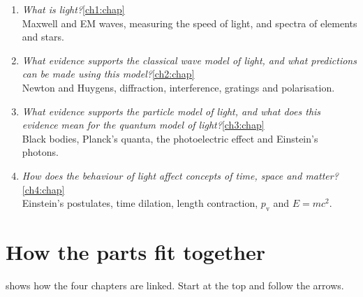 \begin{enumerate}[label=\textbf{IQ\arabic*}, leftmargin=3.2em, itemsep=3pt]
  \item \emph{What is light?}\hfill \cref{ch1:chap}\\
        Maxwell and EM waves, measuring the speed of light, and spectra of elements and stars.
  \item \emph{What evidence supports the classical wave model of light, and what
        predictions can be made using this model?}\hfill \cref{ch2:chap}\\
        Newton and Huygens, diffraction, interference, gratings and polarisation.
  \item \emph{What evidence supports the particle model of light, and what does this
        evidence mean for the quantum model of light?}\hfill \cref{ch3:chap}\\
        Black bodies, Planck's quanta, the photoelectric effect and Einstein's photons.
  \item \emph{How does the behaviour of light affect concepts of time, space and
        matter?}\hfill \cref{ch4:chap}\\
        Einstein's postulates, time dilation, length contraction, $p_\mathrm{v}$ and
        $E = mc^2$.
\end{enumerate}

\section*{How the parts fit together}

 shows how the four chapters are linked. Start at the top and follow the
arrows.

